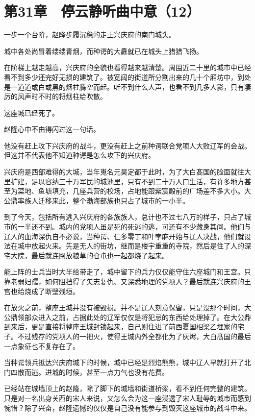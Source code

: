 \section{第31章　停云静听曲中意（12）}

一步一个台阶，赵隆步履沉稳的走上兴庆府的南门城头。

城中各处尚冒着缕缕青烟，而种谔的大纛就已在城头上猎猎飞扬。

在阶梯上越走越高，兴庆府的全貌也看得越来越清楚。周围近二十里的城市中已经看不到多少还完好无损的建筑了。被宽阔的街道所分割出来的几十个厢坊中，到处是一道道或白或黑的烟柱腾空而起。听不到什么人声，也看不到几多人影，只有凄厉的风声时不时的将烟柱给吹散。

这座城已经死了。

赵隆心中不由得闪过这一句话。

他没有赶上攻下兴庆府的战斗，更没有赶上之前种谔联合党项人大败辽军的会战。但这并不代表他不知道种谔是怎么攻下的兴庆府。

兴庆府是西部难得的大城，当年嵬名元昊定都于此时，为了大白髙国的脸面就往大里扩建，足以容纳三十万军民的城池里，只有不到二十万人口生活，有许多地方甚至为菜地、鱼塘填充，几座兵营的校场，占地能跟紫宸殿前的广场差不多大小。大公鼎率族人迁移来此，整个渤海部族也只占了城市的一小半。

到了今天，包括所有逃入兴庆府的各族族人，总计也不过七八万的样子，只占了城市的一半还不到。城内的党项人虽是死的死逃的逃，可还有不少藏身其间。他们与辽人的血海深仇自不必说，当种谔、仁多零丁和叶孛麻开始与辽人决战，他们就设法在城中放起火来。先是无人的街坊，继而是楼宇重重的寺院，然后是住了人的深宅大院，最后就连囤放粮草的仓屯也一起都烧了起来。

能上阵的士兵当时大半给带走了，城中留下的兵力仅仅能守住六座城门和王宫。只靠老弱妇孺，如何阻挡得了矢志复仇、又深悉地理的党项人？最后就连兴庆府的王宫也给烧成了断壁残垣。

在放火之前，整座王城并没有被毁损。并不是辽人刻意保留，只是没那个时间，大公鼎领部众进入之前，占据此处的辽军仅仅是将犯忌的东西给处理掉了。在大公鼎到来后，更是直接将整座王城封锁起来，自己则住进了前西夏国相梁乙埋家的宅子。不过残存的党项人的一把火，使得王城内外全都化为了灰烬，大白髙国的最后一点象征也不复存在了。

当种谔领兵抵达兴庆府城下的时候，城中已经是烈焰熊熊，城中辽人早就打开了北门四散而逃。进城的时候，甚至一点力气也没有花费。

已经站在城墙顶上的赵隆，除了脚下的城墙和街道桥梁，看不到任何完整的建筑。只是对一名出身关西的宋人来说，又怎么会为这一座浸透了宋人耻辱的城市而感到惋惜？除了兴奋，赵隆遗憾的仅仅是自己没有能参与到毁灭这座城市的战斗中来。

